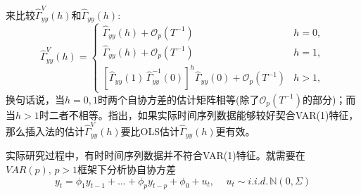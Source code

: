 来比较$\widehat{\Gamma}_{yy}^{V} \left( h \right)$和$\widehat{\Gamma}_{yy} \left( h \right)$:
\begin{equation*}
  \widehat{\Gamma}_{yy}^{V} \left( h \right) =
  \begin{cases}
    \widehat{\Gamma}_{yy} \left( h \right) + \mathcal{O}_{p} \left( T^{-1} \right) & h=0, \\
    \widehat{\Gamma}_{yy} \left( h \right) + \mathcal{O}_{p} \left( T^{-1} \right) & h=1, \\
    \left[ \widehat{\Gamma}_{yy} \left( 1 \right) \,
    \widehat{\Gamma}_{yy}^{-1} \left( 0 \right)
    \right]^{h}
    \widehat{\Gamma}_{yy} \left( 0 \right)
    + \mathcal{O}_{p} \left( T^{-1} \right) & h > 1,
  \end{cases}
\end{equation*}
换句话说，当$h=0,1$时两个自协方差的估计矩阵相等(除了$\mathcal{O}_{p} \left( T^{-1} \right)$的部分)；而当$h>1$时二者不相等。\cite{Schorfheide:2005jg}指出，如果实际时间序列数据能够较好契合VAR(1)特征，那么插入法的估计$\widehat{\Gamma}_{yy}^{V} \left( h \right)$要比OLS估计$\widehat{\Gamma}_{yy} \left( h \right)$更有效。

实际研究过程中，有时时间序列数据并不符合VAR(1)特征。就需要在$VAR(p), \, p >1$框架下分析协自协方差
\begin{equation}
  \label{eq:stylized-ssrep-empirics-varp-def}
  y_{t} = \phi_{1} y_{t-1} + \ldots + \phi_{p} y_{t-p} + \phi_{0} + u_{t}, \quad \, u_{t} \sim i.i.d. \, \mathbb{N} \left( 0, \Sigma \right)
\end{equation}

